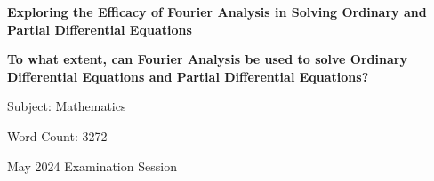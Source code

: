 \begin{titlepage}
    \begin{center}
        \null
        \vfill
            
        \Large
        \textbf{Exploring the Efficacy of Fourier Analysis in Solving Ordinary and Partial Differential Equations}
            
        \vspace{1cm}
        
        \large
        \textbf{To what extent, can Fourier Analysis be used to solve Ordinary Differential Equations and Partial Differential Equations?}

        \vspace{6cm}
        \normalsize
        Subject: Mathematics

        Word Count: 3272
        
        May 2024 Examination Session
        \vfill
    \end{center}
\end{titlepage}
